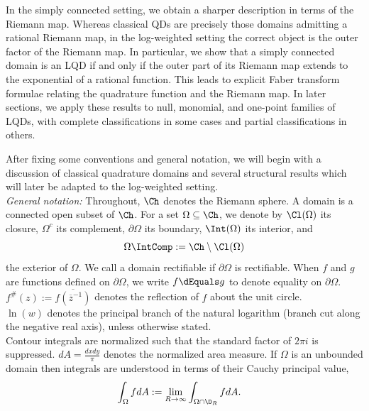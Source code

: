 \documentclass{article}
\numberwithin{equation}{section}
\begin{document}
In the simply connected setting, we obtain a sharper description in terms of the Riemann map. Whereas classical QDs are precisely those domains admitting a rational Riemann map, in the log-weighted setting the correct object is the outer factor of the Riemann map. In particular, we show that a simply connected domain is an LQD if and only if the outer part of its Riemann map extends to the exponential of a rational function. This leads to explicit Faber transform formulae relating the quadrature function and the Riemann map. In later sections, we apply these results to null, monomial, and one-point families of LQDs, with complete classifications in some cases and partial classifications in others.

After fixing some conventions and general notation, we will begin with a discussion of classical quadrature domains and several structural results which will later be adapted to the log-weighted setting.\\


{\it General notation:} Throughout, $\Ch$ denotes the Riemann sphere. A domain is a connected open subset of $\Ch$. For a set $\Omega\subseteq\Ch$, we denote by $\Cl(\Omega)$ its closure, $\Omega^c$ its complement, $\partial\Omega$ its boundary, $\Int(\Omega)$ its interior, and
$$\Omega\IntComp:=\Ch\setminus\Cl(\Omega)$$
the exterior of $\Omega$. We call a domain rectifiable if $\partial\Omega$ is rectifiable. When $f$ and $g$ are functions defined on $\partial\Omega$, we write $f\dEquals g$ to denote equality on $\partial\Omega$. $f^{\#}(z):=\overline{f(\overline{z}^{-1})}$ denotes the reflection of $f$ about the unit circle.\\
$\ln(w)$ denotes the principal branch of the natural logarithm (branch cut along the negative real axis), unless otherwise stated.\\
Contour integrals are normalized such that the standard factor of $2\pi i$ is suppressed. $dA=\frac{dxdy}{\pi}$ denotes the normalized area measure. If $\Omega$ is an unbounded domain then integrals are understood in terms of their Cauchy principal value,
\begin{align*}
    \int_{\Omega}fdA&:=\lim_{R\to\infty}\int_{\Omega\cap\D_R}fdA.
\end{align*}
\end{document}
